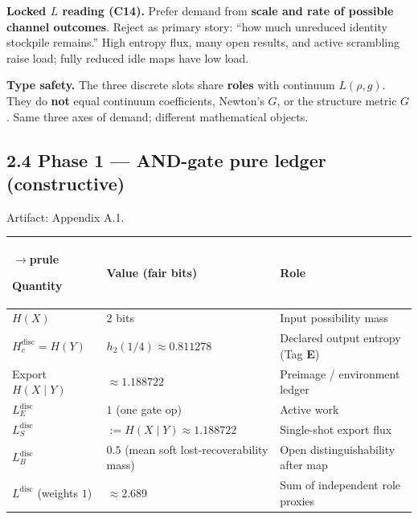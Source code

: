\documentclass[
  11pt,
]{article}
\newcounter{none} %
\begin{document}
\textbf{Locked \(L\) reading (C14).} Prefer demand from \textbf{scale and rate of possible channel outcomes}. Reject as primary story: ``how much unreduced identity stockpile remains.'' High entropy flux, many open results, and active scrambling raise load; fully reduced idle maps have low load.

\textbf{Type safety.} The three discrete slots share \textbf{roles} with continuum \(L(\rho,g)\). They do \textbf{not} equal continuum coefficients, Newton's \(G\), or the structure metric \(G\). Same three axes of demand; different mathematical objects.

\subsection{2.4 Phase 1 --- AND-gate pure ledger (constructive)}\label{phase-1-and-gate-pure-ledger-constructive}

Artifact: Appendix A.1.

{\def\LTcaptype{none} %
\begin{longtable}[]{@{}
  >{\raggedright\arraybackslash}p{}
  >{\raggedright\arraybackslash}p{}
  >{\raggedright\arraybackslash}p{}@{}}
$\rightarrow$prule\noalign{}
\begin{minipage}[b]{\linewidth}\raggedright
Quantity
\end{minipage} & \begin{minipage}[b]{\linewidth}\raggedright
Value (fair bits)
\end{minipage} & \begin{minipage}[b]{\linewidth}\raggedright
Role
\end{minipage} \\
\midrule\noalign{}
\endhead
\bottomrule\noalign{}
\endlastfoot
\(H(X)\) & \(2\) bits & Input possibility mass \\
\(H_c^{\mathrm{disc}}=H(Y)\) & \(h_2(1/4)\approx 0.811278\) & Declared output entropy (Tag \textbf{E}) \\
Export \(H(X\mid Y)\) & \(\approx 1.188722\) & Preimage / environment ledger \\
\(L_E^{\mathrm{disc}}\) & \(1\) (one gate op) & Active work \\
\(L_S^{\mathrm{disc}}\) & \(:=H(X\mid Y)\approx 1.188722\) & Single-shot export flux \\
\(L_B^{\mathrm{disc}}\) & \(0.5\) (mean soft lost-recoverability mass) & Open distinguishability after map \\
\(L^{\mathrm{disc}}\) (weights \(1\)) & \(\approx 2.689\) & Sum of independent role proxies \\
\end{longtable}
}
\end{document}
